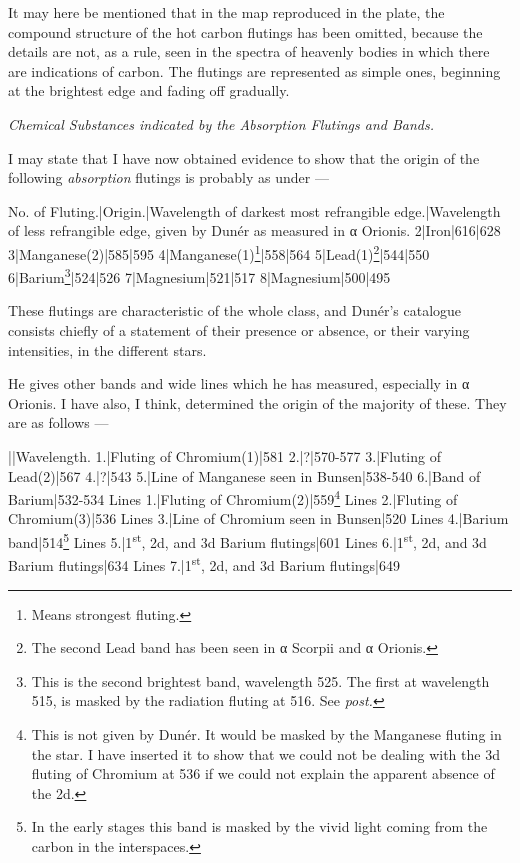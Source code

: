 \documentclass[a4paper, 12pt, oneside, polutonikogreek, english]{article}
\begin{document}
It may here be mentioned that in the map reproduced in the plate, the compound structure of the hot carbon flutings has been omitted, because the details are not, as a rule, seen in the spectra of heavenly bodies in which there are indications of carbon. The flutings are represented as simple ones, beginning at the brightest edge and fading off gradually.

\emph{Chemical Substances indicated by the Absorption Flutings and Bands.}

I may state that I have now obtained evidence to show that the origin of the following \emph{absorption} flutings is probably as under ---

No. of Fluting.|Origin.|Wavelength of darkest most refrangible edge.|Wavelength of less refrangible edge, given by Dunér as measured in α Orionis. 
2|Iron|616|628 
3|Manganese(2)|585|595 
4|Manganese(1)\footnote{Means strongest fluting.}|558|564 
5|Lead(1)\footnote{The second Lead band has been seen in α Scorpii and α Orionis.}|544|550 
6|Barium\footnote{This is the second brightest band, wavelength 525. The first at wavelength 515, is masked by the radiation fluting at 516. See \emph{post.}}|524|526 
7|Magnesium|521|517 
8|Magnesium|500|495 

These flutings are characteristic of the whole class, and Dunér's catalogue consists chiefly of a statement of their presence or absence, or their varying intensities, in the different stars.

He gives other bands and wide lines which he has measured, especially in α Orionis. I have also, I think, determined the origin of the majority of these. They are as follows ---

||Wavelength. 
1.|Fluting of Chromium(1)|581 
2.|?|570-577 
3.|Fluting of Lead(2)|567 
4.|?|543 
5.|Line of Manganese seen in Bunsen|538-540 
6.|Band of Barium|532-534 
Lines 1.|Fluting of Chromium(2)|559\footnote{This is not given by Dunér. It would be masked by the Manganese fluting in the star. I have inserted it to show that we could not be dealing with the 3d fluting of Chromium at 536 if we could not explain the apparent absence of the 2d.} 
Lines 2.|Fluting of Chromium(3)|536 
Lines 3.|Line of Chromium seen in Bunsen|520 
Lines 4.|Barium band|514\footnote{In the early stages this band is masked by the vivid light coming from the carbon in the interspaces.} 
Lines 5.|1\textsuperscript{st}, 2d, and 3d Barium flutings|601 
Lines 6.|1\textsuperscript{st}, 2d, and 3d Barium flutings|634 
Lines 7.|1\textsuperscript{st}, 2d, and 3d Barium flutings|649 
\end{document}
